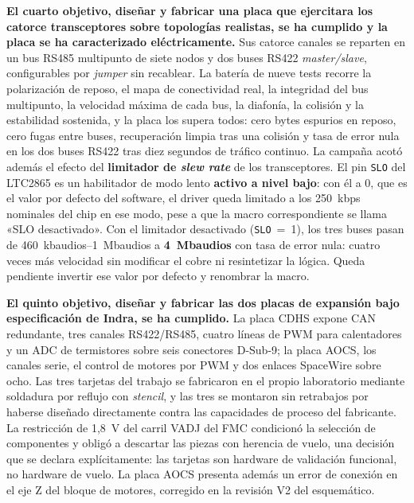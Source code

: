 \textbf{El cuarto objetivo, diseñar y fabricar una placa que ejercitara los catorce transceptores
sobre topologías realistas, se ha cumplido y la placa se ha caracterizado eléctricamente.} Sus
catorce canales se reparten en un bus RS485 multipunto de siete nodos y dos buses RS422
\textit{master/slave}, configurables por \textit{jumper} sin recablear. La batería de nueve tests
recorre la polarización de reposo, el mapa de conectividad real, la integridad del bus multipunto,
la velocidad máxima de cada bus, la diafonía, la colisión y la estabilidad sostenida, y la placa
los supera todos: cero bytes espurios en reposo, cero fugas entre buses, recuperación limpia tras
una colisión y tasa de error nula en los dos buses RS422 tras diez segundos de tráfico continuo.
La campaña acotó además el efecto del \textbf{limitador de \textit{slew rate}} de los
transceptores. El pin \texttt{SLO} del LTC2865 es un habilitador de modo lento \textbf{activo a
nivel bajo}: con él a 0, que es el valor por defecto del software, el driver queda limitado a los
250~kbps nominales del chip en ese modo, pese a que la macro correspondiente se llama «SLO
desactivado». Con el limitador desactivado (\texttt{SLO}~=~1), los tres buses pasan de
460~kbaudios--1~Mbaudios a \textbf{4~Mbaudios} con tasa de error nula: cuatro veces más velocidad sin
modificar el cobre ni resintetizar la lógica. Queda pendiente invertir ese valor por defecto y
renombrar la macro.

\textbf{El quinto objetivo, diseñar y fabricar las dos placas de expansión bajo especificación de
Indra, se ha cumplido.} La placa CDHS expone CAN redundante, tres canales RS422/RS485, cuatro
líneas de PWM para calentadores y un ADC de termistores sobre seis conectores D-Sub-9; la placa
AOCS, los canales serie, el control de motores por PWM y dos enlaces SpaceWire sobre ocho. Las tres
tarjetas del trabajo se fabricaron en el propio laboratorio mediante soldadura por reflujo con
\textit{stencil}, y las tres se montaron sin retrabajos por haberse diseñado directamente contra
las capacidades de proceso del fabricante. La restricción de 1,8~V del carril VADJ del FMC
condicionó la selección de componentes y obligó a descartar las piezas con herencia de vuelo, una
decisión que se declara explícitamente: las tarjetas son hardware de validación funcional, no
hardware de vuelo. La placa AOCS presenta además un error de conexión en el eje Z del bloque de
motores, corregido en la revisión V2 del esquemático.

